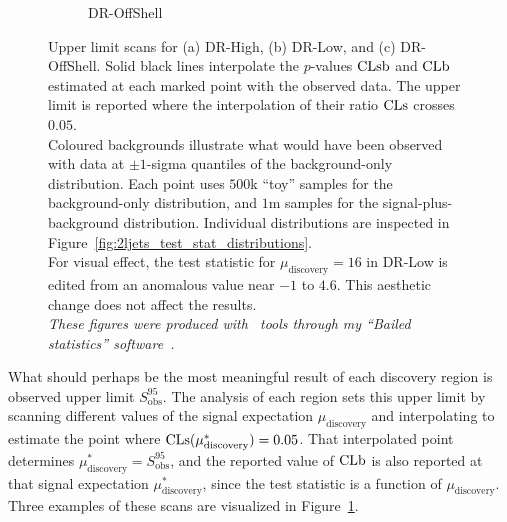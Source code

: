 \begin{figure}[tp]
\begin{subfigure}{0.495\textwidth}
\caption{DR-OffShell}
\end{subfigure}
\caption[
Upper limit scans for DR-High and DR-Low
]{%
Upper limit scans for (a) DR-High, (b) DR-Low, and (c) DR-OffShell.
Solid black lines interpolate the $p$-values $\mathrm{CLsb}$ and $\mathrm{CLb}$ estimated at
each marked point with the observed data.
The upper limit is reported where the interpolation of their ratio $\mathrm{CLs}$
crosses $0.05$.
\\[0.5em]
Coloured backgrounds illustrate what would have been observed with data at
$\pm1$-sigma quantiles of the background-only distribution.
Each point uses $500$k ``toy'' samples for the background-only
distribution, and $1$m samples for the signal-plus-background distribution.
Individual distributions are inspected in
Figure~\ref{fig:2ljets_test_stat_distributions}.
\\[0.5em]
For visual effect, the test statistic for $\mu_\textrm{discovery}=16$
in DR-Low is edited from an anomalous value near $-1$ to $4.6$.
This aesthetic change does not affect the results.
\\[0.5em]
\emph{These figures were produced with \histfitter\ tools through
my ``Bailed statistics'' software~\cite{bailedstatisticsgithub}.}
}
\label{fig:2ljets_upper_limit_scans}
\end{figure}

What should perhaps be the most meaningful result of each discovery region is
observed upper limit $S_{\mathrm{obs}}^{95}$.
The analysis of each region sets this upper limit by scanning different values
of the signal expectation $\mu_\textrm{discovery}$ and interpolating to
estimate the point where $\mathrm{CLs}(\mu_\textrm{discovery}^*) = 0.05$.
That interpolated point determines
$\mu_\textrm{discovery}^* = S_{\mathrm{obs}}^{95}$, and the reported value
of $\mathrm{CLb}$ is also reported at that signal expectation
$\mu_\textrm{discovery}^*$, since the test statistic is a function of
$\mu_\textrm{discovery}$.
Three examples of these scans are visualized in
Figure~\ref{fig:2ljets_upper_limit_scans}.


